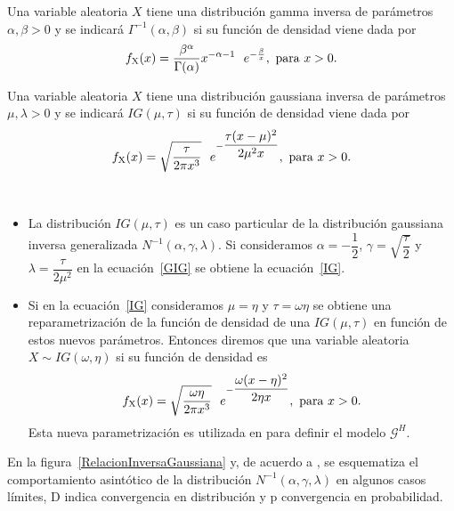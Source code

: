 \begin{definition}
	\label{InversaGamma}
	Una variable aleatoria $X$ tiene una distribución gamma inversa  de parámetros $\alpha, \beta >0$  y se indicará $\Gamma^{-1}(\alpha,\beta)$ si su función de densidad viene dada por
	\begin{align}
	f_{\text X}(x)=\dfrac{\beta^{\alpha}}{\Gamma(\alpha)} x^{-\alpha-1} \ \ e^{- \frac{\beta}{x}}, \text{ para } x>0.
	\end{align}
\end{definition}
\vspace{2mm}
\begin{definition}
	\label{InversaGaussiana}
	Una variable aleatoria $X$ tiene una distribución gaussiana inversa de parámetros $\mu, \lambda >0$  y se indicará $IG(\mu,\tau)$ si su función de densidad viene dada por
	\begin{align}
	\label{IG}
	f_{\text X}(x)=\sqrt{\dfrac{\tau}{2 \pi x^3}} \ \ e^{- \dfrac{\tau (x-\mu)^2}{2 \mu^2 x}}, \text{ para } x>0.
	\end{align}
\end{definition}
\vspace{2mm}
\begin{remark} \ 
	\begin{itemize}
		\item La distribución $IG(\mu,\tau)$ es un caso particular de la distribución gaussiana inversa generalizada $N^{-1}(\alpha,\gamma,\lambda)$. Si consideramos $\alpha=-\dfrac{1}{2}$, $\gamma=\sqrt{\dfrac{\tau}{2}}$ y $\lambda=\dfrac{\tau}{2\mu^2}$ en la ecuación~\eqref{GIG} se obtiene la ecuación~\eqref{IG}.
		\item Si en la ecuación~\eqref{IG} consideramos $\mu=\eta$ y $\tau=\omega \eta$ se obtiene una reparametrización de la función de densidad de una $IG(\mu,\tau)$ en función de estos nuevos parámetros. Entonces diremos que una variable aleatoria $X \sim IG(\omega,\eta)$ si su función de densidad es 
		\begin{align}
		\label{OtraIG}
		f_{\text X}(x)=\sqrt{\dfrac{\omega \eta}{2 \pi x^3}} \ \ e^{- \dfrac{\omega (x-\eta)^2}{2 \eta x}}, \text{ para } x>0.
		\end{align}
		Esta nueva parametrización es utilizada en \citet{Buemi2009} para definir el modelo $\mathcal{G}^H$.
	\end{itemize} 
\end{remark}


En la figura~\ref{RelacionInversaGaussiana} y, de acuerdo a \citet{Frery99}, se esquematiza el comportamiento asintótico de la distribución $N^{-1}(\alpha,\gamma,\lambda)$ en algunos casos límites, D indica convergencia en distribución y p convergencia en probabilidad.

